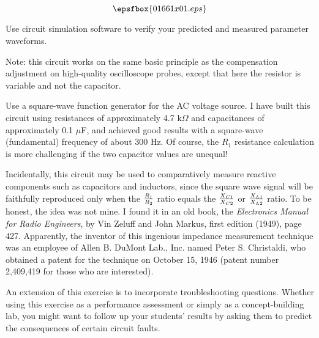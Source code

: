 

$$\epsfbox{01661x01.eps}$$

\vfil \eject






Use circuit simulation software to verify your predicted and measured parameter waveforms.

\vskip 10pt

Note: this circuit works on the same basic principle as the compensation adjustment on high-quality oscilloscope probes, except that here the resistor is variable and not the capacitor.







Use a square-wave function generator for the AC voltage source.  I have built this circuit using resistances of approximately 4.7 k$\Omega$ and capacitances of approximately 0.1 $\mu$F, and achieved good results with a square-wave (fundamental) frequency of about 300 Hz.  Of course, the $R_1$ resistance calculation is more challenging if the two capacitor values are unequal!

Incidentally, this circuit may be used to comparatively measure reactive components such as capacitors and inductors, since the square wave signal will be faithfully reproduced only when the $R_1 \over R_2$ ratio equals the $X_{C1} \over X_{C2}$ or $X_{L1} \over X_{L2}$ ratio.  To be honest, the idea was not mine.  I found it in an old book, the {\it Electronics Manual for Radio Engineers}, by Vin Zeluff and John Markus, first edition (1949), page 427.  Apparently, the inventor of this ingenious impedance measurement technique was an employee of Allen B. DuMont Lab., Inc. named Peter S. Christaldi, who obtained a patent for the technique on October 15, 1946 (patent number 2,409,419 for those who are interested).

An extension of this exercise is to incorporate troubleshooting questions.  Whether using this exercise as a performance assessment or simply as a concept-building lab, you might want to follow up your students' results by asking them to predict the consequences of certain circuit faults.




